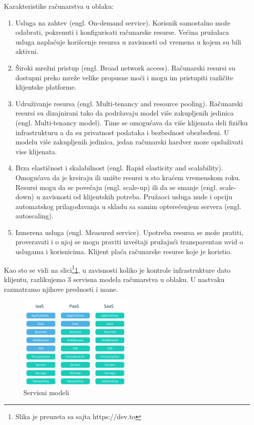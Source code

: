 \documentclass[12pt,oneside]{memoir}
\begin{document}
Karakteristike računarstva u oblaku:
\begin{enumerate}
  \item Usluga na zahtev (engl. On-demand service). Korisnik samostalno može odabrati, pokrenuti i konfigurisati računarske resurse. Većina pružalaca usluga naplaćuje korišcenje resursa u zavisnosti od vremena u kojem su bili aktivni.
  \item Široki mrežni pristup (engl. Broad network access). Računarski resursi su dostupni preko mreže velike propusne moći i mogu im pristupiti različite klijentske platforme.
  \item Udruživanje resursa (engl. Multi-tenancy and resource pooling). Računarski resursi su dizajnirani tako da podržavaju model više zakupljenih jedinica (engl. Multi-tenancy model). Time se omogućava da više klijenata deli fizičku infrastrukturu a da su privatnost podataka i bezbednost obezbeđeni. U modelu više zakupljenih jedinica, jedan računarski hardver moze opsluživati vise klijenata.
  \item Brza elastičnost i skalabilnost (engl. Rapid elasticity and scalability). Omogućava da je kreiraju ili unište resursi u sto kraćem vremenskom roku. Resursi mogu da se povećaju (engl. scale-up) ili da se smanje (engl. scale-down) u zavisnosti od klijentskih potreba. Pružaoci usluga nude i opciju automatskog prilagođavanja u skladu sa samim opterećenjem servera (engl. autoscaling).
  \item Izmerena usluga (engl. Measured service). Upotreba resursa se može pratiti, proveravati i o njoj se mogu praviti izveštaji pružajući transparentan uvid o uslugama i korisnicima. Klijent plaća računarske resurse koje je koristio.
\end{enumerate}

Kao sto se vidi na slici\footnote{Slika je preuzeta sa sajta https://dev.to}\ref{fig:servisniModeli}, u zavisnosti koliko je kontrole infrastrukture dato klijentu, razlikujemo 3 servisna modela računarstva u oblaku. U nastvaku razmatramo njihove prednosti i mane.

\begin{figure}[!ht]
  \centering
  \includegraphics[width=0.5\textwidth]{Slika 5.png}
  \caption{Servisni modeli}
  \label{fig:servisniModeli}
\end{figure}
 
\end{document}
